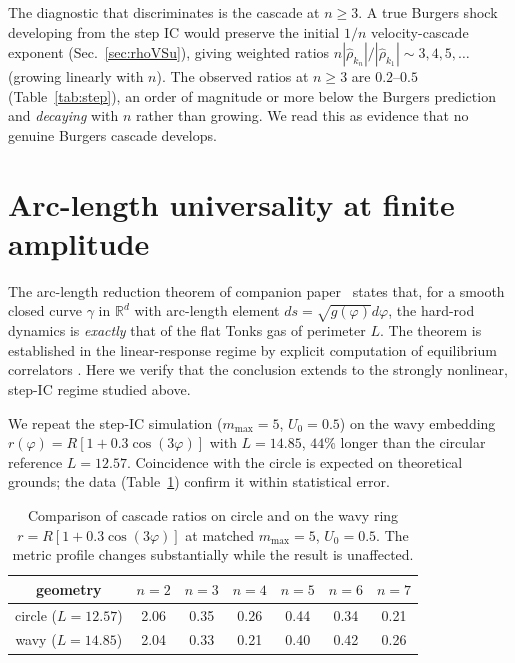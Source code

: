 \documentclass[aps,pre,twocolumn,superscriptaddress,longbibliography,floatfix]{revtex4-2}
\begin{document}
The diagnostic that discriminates is the cascade at $n\ge 3$.
A true Burgers shock developing from the step IC would preserve
the initial $1/n$ velocity-cascade exponent (Sec.~\ref{sec:rhoVSu}),
giving weighted ratios $n|\hat\rho_{k_n}|/|\hat\rho_{k_1}|
\sim 3, 4, 5,\ldots$ (growing linearly with $n$). The observed
ratios at $n\ge 3$ are $0.2$--$0.5$ (Table~\ref{tab:step}), an
order of magnitude or more below the Burgers prediction and
\emph{decaying} with $n$ rather than growing. We read this as
evidence that no genuine Burgers cascade develops.

\section{Arc-length universality at finite amplitude}
\label{sec:curved}

The arc-length reduction theorem of companion paper~\cite{PaperI}
states that, for a smooth closed curve $\gamma$ in
$\mathbb{R}^d$ with arc-length element
$ds=\sqrt{g(\varphi)}d\varphi$, the hard-rod dynamics is
\emph{exactly} that of the flat Tonks gas of perimeter $L$. The
theorem is established in the linear-response regime by
explicit computation of equilibrium correlators
\cite{PaperI,PaperII}. Here we verify that the conclusion
extends to the strongly nonlinear, step-IC regime studied
above.

We repeat the step-IC simulation ($m_{\max}=5$, $U_0=0.5$) on
the wavy embedding $r(\varphi)=R[1+0.3\cos(3\varphi)]$ with
$L=14.85$, $44\%$ longer than the circular reference
$L=12.57$. Coincidence with the circle is expected on
theoretical grounds; the data
(Table~\ref{tab:curved}) confirm it within statistical error.

\begin{table}[t]
\centering
\caption{Comparison of cascade ratios on circle and on the
wavy ring $r=R[1+0.3\cos(3\varphi)]$ at matched $m_{\max}=5$,
$U_0=0.5$. The metric profile changes substantially while the
result is unaffected.}
\label{tab:curved}
\begin{tabular}{ccccccc}
\hline\hline
geometry & $n=2$ & $n=3$ & $n=4$ & $n=5$ & $n=6$ & $n=7$\\
\hline
circle ($L=12.57$) & 2.06 & 0.35 & 0.26 & 0.44 & 0.34 & 0.21\\
wavy ($L=14.85$)   & 2.04 & 0.33 & 0.21 & 0.40 & 0.42 & 0.26\\
\hline\hline
\end{tabular}
\end{table}
\end{document}
